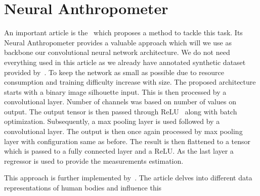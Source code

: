 \section{Neural Anthropometer}
An important article is the~\cite{source} which proposes a method to tackle this task. Its Neural Anthropometer provides a valuable approach which will we use as backbone our convolutional neural network architecture. We do not need everything used in this article as we already have annotated synthetic dataset provided by~\cite{super}. To keep the network as small as possible due to resource consumption and training difficulty increase with size. The proposed architecture starts with a binary image silhouette input. This is then processed by a convolutional layer. Number of channels was based on number of values on output. The output tensor is then passed through ReLU~\cite{relu} along with batch optimization. Subsequently, a max pooling layer is used followed by a  convolutional layer. The output is then once again processed by max pooling layer with configuration same as before.  The result is then flattened to a tensor which is passed to a fully connected layer and a ReLU. As the last layer a regressor is used to provide the measurements estimation.

This approach is further implemented by~\cite{super}. The article delves into different data representations of human bodies and influence this 
